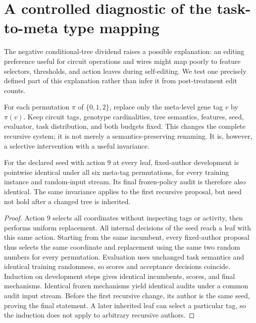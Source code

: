 \section{A controlled diagnostic of the task-to-meta type mapping}\label{app:adapterdiagnostic}
The negative conditional-tree dividend raises a possible explanation: an editing preference useful for circuit operations and wires might map poorly to feature selectors, thresholds, and action leaves during self-editing. We test one precisely defined part of this explanation rather than infer it from post-treatment edit counts.

For each permutation $\pi$ of $\{0,1,2\}$, replace only the meta-level gene tag $v$ by $\pi(v)$. Keep circuit tags, genotype cardinalities, tree semantics, features, seed, evaluator, task distribution, and both budgets fixed. This changes the complete recursive system; it is not merely a semantics-preserving renaming. It is, however, a selective intervention with a useful invariance.

\begin{proposition}\label{prop:adapterinvariance}
For the declared seed with action 9 at every leaf, fixed-author development is pointwise identical under all six meta-tag permutations, for every training instance and random-input stream. Its final frozen-policy audit is therefore also identical. The same invariance applies to the first recursive proposal, but need not hold after a changed tree is inherited.
\end{proposition}
\begin{proof}
Action 9 selects all coordinates without inspecting tags or activity, then performs uniform replacement. All internal decisions of the seed reach a leaf with this same action. Starting from the same incumbent, every fixed-author proposal thus selects the same coordinate and replacement using the same two random numbers for every permutation. Evaluation uses unchanged task semantics and identical training randomness, so scores and acceptance decisions coincide. Induction on development steps gives identical incumbents, scores, and final mechanisms. Identical frozen mechanisms yield identical audits under a common audit input stream. Before the first recursive change, its author is the same seed, proving the final statement. A later inherited leaf can select a particular tag, so the induction does not apply to arbitrary recursive authors.
\end{proof}

